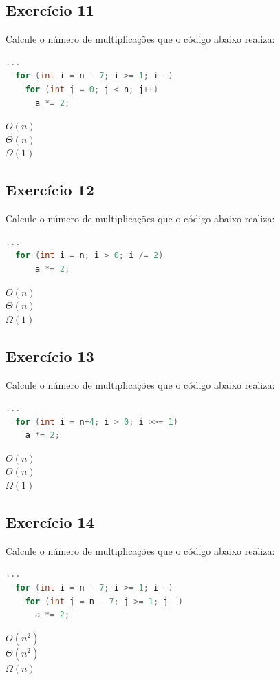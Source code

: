 \documentclass[12pt]{article}
\begin{document}
\subsection{Exercício 11}
Calcule o número de multiplicações que o código abaixo realiza:
\begin{lstlisting}[language=C]
  ...
  for (int i = n - 7; i >= 1; i--)
    for (int j = 0; j < n; j++)
      a *= 2;

\end{lstlisting}
$O(n)$\\
$\Theta(n)$\\
$\Omega(1)$\\

\subsection{Exercício 12}
Calcule o número de multiplicações que o código abaixo realiza:
\begin{lstlisting}[language=C]
  ...
  for (int i = n; i > 0; i /= 2)
      a *= 2;

\end{lstlisting}
$O(n)$\\
$\Theta(n)$\\
$\Omega(1)$\\

\subsection{Exercício 13}
Calcule o número de multiplicações que o código abaixo realiza:
\begin{lstlisting}[language=C]
  ...
  for (int i = n+4; i > 0; i >>= 1)
    a *= 2;
\end{lstlisting}
$O(n)$\\
$\Theta(n)$\\
$\Omega(1)$\\

\subsection{Exercício 14}
Calcule o número de multiplicações que o código abaixo realiza:
\begin{lstlisting}[language=C]
  ...
  for (int i = n - 7; i >= 1; i--)
    for (int j = n - 7; j >= 1; j--)
      a *= 2;

\end{lstlisting}
$O(n^2)$\\
$\Theta(n^2)$\\
$\Omega(n)$\\
\end{document}
